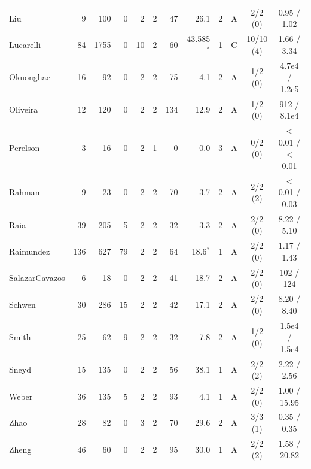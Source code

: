 \begin{tabular}{@{}lrrrrcrrcccc@{}}
Liu & 9 & 100 & 0 & 2 & 2 & 47 & 26.1 & 2 & A & 2/2 (0) & 0.95 / 1.02 \\
Lucarelli & 84 & 1755 & 0 & 10 & 2 & 60 & 43.585$^{\ast}$ & 1 & C & 10/10 (4) & 1.66 / 3.34 \\
Okuonghae & 16 & 92 & 0 & 2 & 2 & 75 & 4.1 & 2 & A & 1/2 (0) & 4.7e4 / 1.2e5 \\
Oliveira & 12 & 120 & 0 & 2 & 2 & 134 & 12.9 & 2 & A & 1/2 (0) & 912 / 8.1e4 \\
Perelson & 3 & 16 & 0 & 2 & 1 & 0 & 0.0 & 3 & A & 0/2 (0) & $<$0.01 / $<$0.01 \\
Rahman & 9 & 23 & 0 & 2 & 2 & 70 & 3.7 & 2 & A & 2/2 (2) & $<$0.01 / 0.03 \\
Raia & 39 & 205 & 5 & 2 & 2 & 32 & 3.3 & 2 & A & 2/2 (0) & 8.22 / 5.10 \\
Raimundez & 136 & 627 & 79 & 2 & 2 & 64 & 18.6$^{\ast}$ & 1 & A & 2/2 (0) & 1.17 / 1.43 \\
SalazarCavazos & 6 & 18 & 0 & 2 & 2 & 41 & 18.7 & 2 & A & 2/2 (0) & 102 / 124 \\
Schwen & 30 & 286 & 15 & 2 & 2 & 42 & 17.1 & 2 & A & 2/2 (0) & 8.20 / 8.40 \\
Smith & 25 & 62 & 9 & 2 & 2 & 32 & 7.8 & 2 & A & 1/2 (0) & 1.5e4 / 1.5e4 \\
Sneyd & 15 & 135 & 0 & 2 & 2 & 56 & 38.1 & 1 & A & 2/2 (2) & 2.22 / 2.56 \\
Weber & 36 & 135 & 5 & 2 & 2 & 93 & 4.1 & 1 & A & 2/2 (0) & 1.00 / 15.95 \\
Zhao & 28 & 82 & 0 & 3 & 2 & 70 & 29.6 & 2 & A & 3/3 (1) & 0.35 / 0.35 \\
Zheng & 46 & 60 & 0 & 2 & 2 & 95 & 30.0 & 1 & A & 2/2 (2) & 1.58 / 20.82 \\
\bottomrule
\end{tabular}
